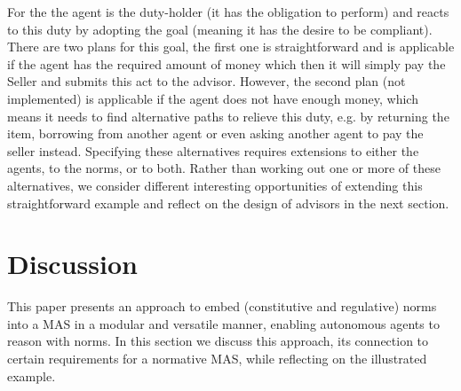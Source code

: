 For the  the agent is the duty-holder (it has the obligation to perform) and reacts to this duty by adopting the goal  (meaning it has the desire to be compliant). There are two plans for this goal, the first one is straightforward and is applicable if the agent has the required amount of money which then it will simply pay the Seller and submits this act to the advisor. However, the second plan (not implemented) is applicable if the agent does not have enough money, which means it needs to find alternative paths to relieve this duty, e.g. by returning the item, borrowing from another agent or even asking another agent to pay the seller instead. Specifying these alternatives requires extensions to either the agents, to the norms, or to both. Rather than working out one or more of these alternatives, we consider different interesting opportunities of extending this straightforward example and reflect on the design of advisors in the next section.  

\section{Discussion}
\label{sec:discussion}



 



This paper presents an approach to embed (constitutive and regulative) norms into a MAS in a modular and versatile manner, enabling autonomous agents to reason with norms. 
%
In this section we discuss this approach, its connection to certain requirements for a normative MAS, while reflecting on the illustrated example.

